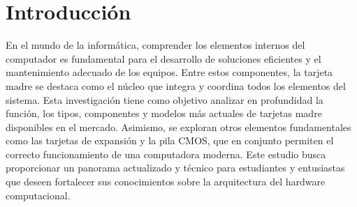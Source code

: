\chapter{Introducción}

En el mundo de la informática, comprender los elementos internos del computador es fundamental para el desarrollo de soluciones eficientes y el mantenimiento adecuado de los equipos. Entre estos componentes, la tarjeta madre se destaca como el núcleo que integra y coordina todos los elementos del sistema. Esta investigación tiene como objetivo analizar en profundidad la función, los tipos, componentes y modelos más actuales de tarjetas madre disponibles en el mercado. Asimismo, se exploran otros elementos fundamentales como las tarjetas de expansión y la pila CMOS, que en conjunto permiten el correcto funcionamiento de una computadora moderna. Este estudio busca proporcionar un panorama actualizado y técnico para estudiantes y entusiastas que deseen fortalecer sus conocimientos sobre la arquitectura del hardware computacional.
